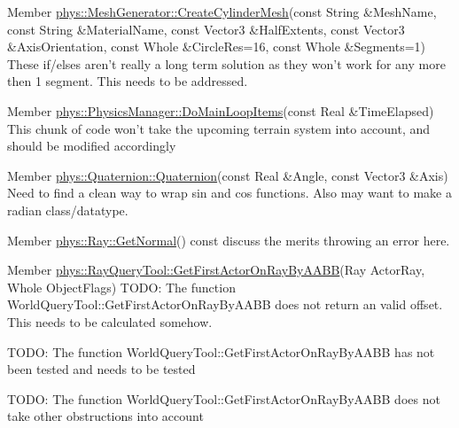 \label{todo__todo000017}
\hypertarget{todo__todo000017}{}
 
\begin{DoxyDescription}
\item[Member \hyperlink{classphys_1_1MeshGenerator_a7d7372e91e3d039c656f78be3cb5b951}{phys::MeshGenerator::CreateCylinderMesh}(const String \&MeshName, const String \&MaterialName, const Vector3 \&HalfExtents, const Vector3 \&AxisOrientation, const Whole \&CircleRes=16, const Whole \&Segments=1) ]These if/elses aren't really a long term solution as they won't work for any more then 1 segment. This needs to be addressed. 
\end{DoxyDescription}

\label{todo__todo000018}
\hypertarget{todo__todo000018}{}
 
\begin{DoxyDescription}
\item[Member \hyperlink{classphys_1_1PhysicsManager_ad363d6683a0276395eeb2c42a56f95fc}{phys::PhysicsManager::DoMainLoopItems}(const Real \&TimeElapsed) ]This chunk of code won't take the upcoming terrain system into account, and should be modified accordingly 
\end{DoxyDescription}

\label{todo__todo000019}
\hypertarget{todo__todo000019}{}
 
\begin{DoxyDescription}
\item[Member \hyperlink{classphys_1_1Quaternion_a9246247b7b28f19839148415a7ddeb96}{phys::Quaternion::Quaternion}(const Real \&Angle, const Vector3 \&Axis) ]Need to find a clean way to wrap sin and cos functions. Also may want to make a radian class/datatype. 
\end{DoxyDescription}

\label{todo__todo000020}
\hypertarget{todo__todo000020}{}
 
\begin{DoxyDescription}
\item[Member \hyperlink{classphys_1_1Ray_a7445c25acb6ce865ef85e7ada829ccba}{phys::Ray::GetNormal}() const  ]discuss the merits throwing an error here. 
\end{DoxyDescription}

\label{todo__todo000021}
\hypertarget{todo__todo000021}{}
 
\begin{DoxyDescription}
\item[Member \hyperlink{classphys_1_1RayQueryTool_af4bba2ed8f201d4b0e9a05728d8bd1b6}{phys::RayQueryTool::GetFirstActorOnRayByAABB}(Ray ActorRay, Whole ObjectFlags) ]TODO: The function WorldQueryTool::GetFirstActorOnRayByAABB does not return an valid offset. This needs to be calculated somehow. 

TODO: The function WorldQueryTool::GetFirstActorOnRayByAABB has not been tested and needs to be tested 

TODO: The function WorldQueryTool::GetFirstActorOnRayByAABB does not take other obstructions into account 
\end{DoxyDescription}

